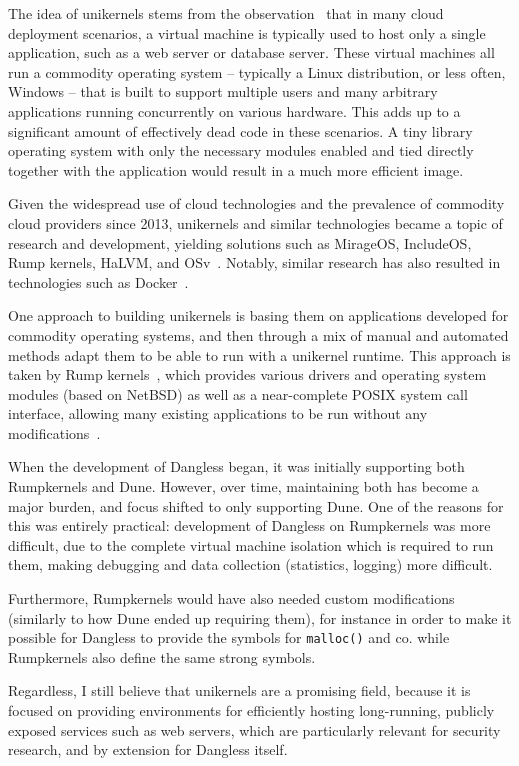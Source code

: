 The idea of unikernels stems from the observation~\cite{unikernels-intro} that in many cloud deployment scenarios, a virtual machine is typically used to host only a single application, such as a web server or database server. These virtual machines all run a commodity operating system -- typically a Linux distribution, or less often, Windows -- that is built to support multiple users and many arbitrary applications running concurrently on various hardware. This adds up to a significant amount of effectively dead code in these scenarios.
A tiny library operating system with only the necessary modules enabled and tied directly together with the application would result in a much more efficient image.

Given the widespread use of cloud technologies and the prevalence of commodity cloud providers since 2013, unikernels and similar technologies became a topic of research and development, yielding solutions such as MirageOS, IncludeOS, Rump kernels, HaLVM, and OSv~\cite{unikernels-list}. Notably, similar research has also resulted in technologies such as Docker~\cite{docker-web}.

One approach to building unikernels is basing them on applications developed for commodity operating systems, and then through a mix of manual and automated methods adapt them to be able to run with a unikernel runtime. This approach is taken by Rump kernels~\cite{rumpkernels-web}, which provides various drivers and operating system modules (based on NetBSD) as well as a near-complete POSIX system call interface, allowing many existing applications to be run without any modifications~\cite{rumpkernels-doc}.

When the development of Dangless began, it was initially supporting both Rumpkernels and Dune. However, over time, maintaining both has become a major burden, and focus shifted to only supporting Dune. One of the reasons for this was entirely practical: development of Dangless on Rumpkernels was more difficult, due to the complete virtual machine isolation which is required to run them, making debugging and data collection (statistics, logging) more difficult.

Furthermore, Rumpkernels would have also needed custom modifications (similarly to how Dune ended up requiring them), for instance in order to make it possible for Dangless to provide the symbols for \lstinline!malloc()! and co. while Rumpkernels also define the same strong symbols.

Regardless, I still believe that unikernels are a promising field, because it is focused on providing environments for efficiently hosting long-running, publicly exposed services such as web servers, which are particularly relevant for security research, and by extension for Dangless itself.

